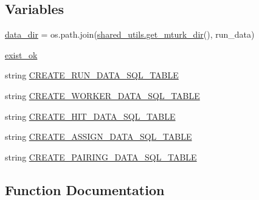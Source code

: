 \subsection*{Variables}
\begin{DoxyCompactItemize}
\item 
\hyperlink{namespaceparlai_1_1mturk_1_1core_1_1dev_1_1mturk__data__handler_ac09f41edba457d8e1fc11da9154958d9}{data\+\_\+dir} = os.\+path.\+join(\hyperlink{namespaceparlai_1_1mturk_1_1core_1_1dev_1_1shared__utils_a1a7ab908ecffbfc1fabb5222625d35a2}{shared\+\_\+utils.\+get\+\_\+mturk\+\_\+dir}(), \textquotesingle{}run\+\_\+data\textquotesingle{})
\item 
\hyperlink{namespaceparlai_1_1mturk_1_1core_1_1dev_1_1mturk__data__handler_a5e74bfcab8936656421142da4213addb}{exist\+\_\+ok}
\item 
string \hyperlink{namespaceparlai_1_1mturk_1_1core_1_1dev_1_1mturk__data__handler_abe357c7a65e8a413b229727b750facf3}{C\+R\+E\+A\+T\+E\+\_\+\+R\+U\+N\+\_\+\+D\+A\+T\+A\+\_\+\+S\+Q\+L\+\_\+\+T\+A\+B\+LE}
\item 
string \hyperlink{namespaceparlai_1_1mturk_1_1core_1_1dev_1_1mturk__data__handler_a00d6b9648875a287e673c3c39f19ba76}{C\+R\+E\+A\+T\+E\+\_\+\+W\+O\+R\+K\+E\+R\+\_\+\+D\+A\+T\+A\+\_\+\+S\+Q\+L\+\_\+\+T\+A\+B\+LE}
\item 
string \hyperlink{namespaceparlai_1_1mturk_1_1core_1_1dev_1_1mturk__data__handler_a3e4e8efbdbbfbfcf841ffc1cfb5c741a}{C\+R\+E\+A\+T\+E\+\_\+\+H\+I\+T\+\_\+\+D\+A\+T\+A\+\_\+\+S\+Q\+L\+\_\+\+T\+A\+B\+LE}
\item 
string \hyperlink{namespaceparlai_1_1mturk_1_1core_1_1dev_1_1mturk__data__handler_a2250838eb6ae34a406c24cc68de3db25}{C\+R\+E\+A\+T\+E\+\_\+\+A\+S\+S\+I\+G\+N\+\_\+\+D\+A\+T\+A\+\_\+\+S\+Q\+L\+\_\+\+T\+A\+B\+LE}
\item 
string \hyperlink{namespaceparlai_1_1mturk_1_1core_1_1dev_1_1mturk__data__handler_a47283f5afce715b73965cdc188fde863}{C\+R\+E\+A\+T\+E\+\_\+\+P\+A\+I\+R\+I\+N\+G\+\_\+\+D\+A\+T\+A\+\_\+\+S\+Q\+L\+\_\+\+T\+A\+B\+LE}
\end{DoxyCompactItemize}


\subsection{Function Documentation}
\mbox{\label{namespaceparlai_1_1mturk_1_1core_1_1dev_1_1mturk__data__handler_a91afc0627fc6e88d49e71f4471fb56b8}} 
